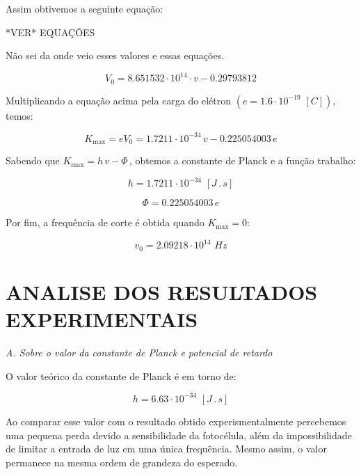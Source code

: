 \documentclass[10pt,twocolumn,letterpaper]{article}
\begin{document}
\noindent Assim obtivemos a seguinte equação:

{\Huge \color{red} *VER* EQUAÇÕES}

{\color{red} Não sei da onde veio esses valores e essas equações.}

\begin{equation*}
    V_0 = 8.651532\cdot 10^{14} \cdot v - 0.29793812
\end{equation*}

\hspace{1cm} Multiplicando a equação acima pela carga do elétron $(e =
1.6 \cdot 10^{-19} \,\, [C])$, temos:

\begin{equation*}
    K_{\max} = eV_0 = 1.7211 \cdot 10^{-34}\,v - 0.225054003\,e
\end{equation*}

\hspace{1cm} Sabendo que $K_{\max} = h\,v - \Phi\,$, obtemos a constante de
Planck e a função trabalho:

\begin{equation*}
    h = 1.7211\cdot 10^{-34} \,\, [J\,.\,s]
\end{equation*}

\begin{equation*}
    \Phi = 0.225054003\,e
\end{equation*}

\noindent Por fim, a frequência de corte é obtida quando $K_{\max} = 0$:

\begin{equation*}
    v_0 = 2.09218 \cdot 10^{14} \,\, Hz
\end{equation*}


\section{ANALISE DOS RESULTADOS EXPERIMENTAIS}

\noindent\textit{A. Sobre o valor da constante de Planck e potencial de
retardo}

\noindent O valor teórico da constante de Planck é em torno de:

\begin{equation*}
    h = 6.63 \cdot 10^{-34} \,\, [J\,.\,s]
\end{equation*}

\hspace{1cm} Ao comparar esse valor com o resultado obtido experismentalmente percebemos uma pequena perda devido a sensibilidade da fotocélula, além da impossibilidade de limitar a entrada de luz em uma única frequência. Mesmo assim, o valor permanece na mesma ordem de grandeza do esperado.
\end{document}
